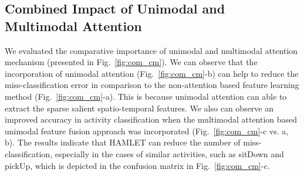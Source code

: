\documentclass[runningheads]{llncs}
\newcommand{\pa}{HAMLET}
\begin{document}
\begin{comment}
Moreover, we also compared the performance of {\pa } with the state-of-the-art unimodal methods on UT-Kinect datasets. {\pa } showed competitive performance by achieving 97.5\% top-1 accuracy in comparison with skeleton-based GR-GCN methods, which achieved 98.5\% accuracy. As there are some low-quality data in the RGB modality, if we provide some better training samples and conduct the leave-one-actor-out cross-validation, then our proposed method {\pa } outperformed the state-of-the-art works and achieved the highest accuracy 98.89\%.

\begin{table}[!h]
    \centering
    \caption{Performance comparison of unimodal HAR methods with {\pa} on UT-Kinect \cite{ut_kinect} (V:RGB, S: skeleton)}
    \label{tab:com_on_uni_mit_ucsd}
    \begin{tabular}{lcc}
        \toprule
        Method& Modality & F1-Score (\%) \\
        \hline
        Bi-LSTM \cite{bi_lstm}  & S & 96.9\\
ST-LSTM(Tree) + Trust Gate \cite{st_lstm_trust_gate} & S & 97.0\\
GR-GCN \cite{gr_gcn}& S & 98.5\\
{\pa} & V+S & 97.5\\ 
{\pa } (FT) & V+S & 98.89\\ 
        \bottomrule
    \end{tabular}
\end{table}


\end{comment}



\subsection{Combined Impact of Unimodal and Multimodal Attention}
\par We evaluated the comparative importance of unimodal and multimodal attention mechanism (presented in Fig.~\ref{fig:com_cm}). We can observe that the incorporation of unimodal attention (Fig.~\ref{fig:com_cm}-b) can help to reduce the miss-classification error in comparison to the non-attention based feature learning method (Fig.~\ref{fig:com_cm}-a). This is because unimodal attention can able to extract the sparse salient spatio-temporal features. We also can observe an improved accuracy in activity classification when the multimodal attention based unimodal feature fusion approach was incorporated (Fig.~\ref{fig:com_cm}-c vs. a, b). The results indicate that {\pa } can reduce the number of miss-classification, especially in the cases of similar activities, such as sitDown and pickUp, which is depicted in the confusion matrix in Fig.~\ref{fig:com_cm}-c.
\end{document}

